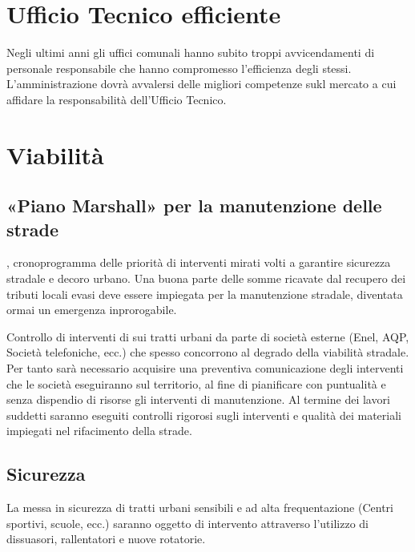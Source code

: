 \documentclass[a4paper,14pt,italian]{sphinxmanual}
\begin{document}
\section{Ufficio Tecnico efficiente}
\label{\detokenize{urbanistica:ufficio-tecnico-efficiente}}
Negli ultimi anni gli uffici comunali hanno subito troppi avvicendamenti di personale responsabile che hanno compromesso l’efficienza degli stessi.
L’amministrazione dovrà avvalersi delle migliori competenze sukl mercato a cui affidare la responsabilità dell’Ufficio Tecnico.


\section{Viabilità}
\label{\detokenize{urbanistica:viabilita}}

\subsection{«Piano Marshall» per la manutenzione delle strade}
\label{\detokenize{urbanistica:piano-marshall-per-la-manutenzione-delle-strade}}
, cronoprogramma delle priorità di interventi mirati volti a garantire sicurezza stradale e decoro urbano.
Una buona parte delle somme ricavate dal recupero dei tributi locali evasi deve essere impiegata per la manutenzione stradale, diventata ormai un emergenza inprorogabile.

Controllo di interventi di sui tratti urbani da parte di società esterne (Enel, AQP, Società telefoniche, ecc.) che spesso concorrono al degrado della viabilità stradale.
Per tanto sarà necessario acquisire una preventiva comunicazione degli interventi che le società eseguiranno sul territorio, al fine di pianificare con puntualità e senza dispendio di risorse gli interventi di manutenzione.
Al termine dei lavori suddetti saranno eseguiti controlli rigorosi sugli interventi e qualità dei materiali impiegati nel rifacimento della strade.




\subsection{Sicurezza}
\label{\detokenize{urbanistica:sicurezza}}
La messa in sicurezza di tratti urbani sensibili e ad alta frequentazione (Centri sportivi, scuole, ecc.) saranno oggetto di intervento attraverso l’utilizzo di dissuasori, rallentatori e nuove rotatorie.
\end{document}
